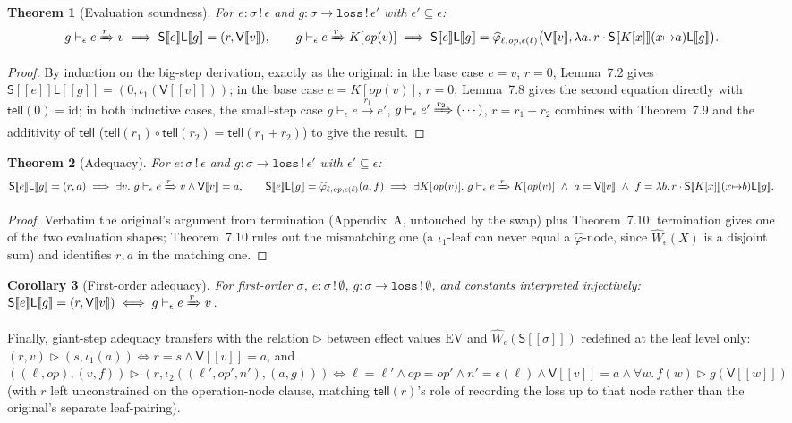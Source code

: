 \documentclass[11pt]{article}
\theoremstyle{plain}
\newtheorem{theorem}{Theorem}
\newtheorem{corollary}[theorem]{Corollary}
\newcommand{\Ssem}[1]{\mathsf{S}[\![#1]\!]}
\newcommand{\Lsem}[1]{\mathsf{L}[\![#1]\!]}
\newcommand{\Vsem}[1]{\mathsf{V}[\![#1]\!]}
\newcommand{\eps}{\epsilon}
\newcommand{\op}{\mathit{op}}
\newcommand{\tell}{\mathsf{tell}}
\begin{document}
\begin{theorem}[Evaluation soundness]
For $e:\sigma\,!\,\eps$ and $g:\sigma\to\mathtt{loss}\,!\,\eps'$ with $\eps'\subseteq\eps$:
\[
  g\vdash_\eps e\xRightarrow{r}v \implies \Ssem e\Lsem g = (r,\Vsem v), \qquad
  g\vdash_\eps e\xRightarrow{r}K[\op(v)] \implies \Ssem e\Lsem g = \widehat\varphi_{\ell,\op,\eps(\ell)}\big(\Vsem v,\lambda a.\,r\cdot\Ssem{K[x]}(x{\mapsto}a)\Lsem g\big).
\]
\end{theorem}
\begin{proof}
By induction on the big-step derivation, exactly as the original: in the base case $e=v$, $r=0$,
Lemma~7.2 gives $\Ssem e\Lsem g = (0,\iota_1(\Vsem v))$; in the base case $e=K[\op(v)]$, $r=0$,
Lemma~7.8 gives the second equation directly with $\tell(0)=\mathrm{id}$; in both inductive
cases, the small-step case $g\vdash_\eps e\xrightarrow{r_1}e'$, $g\vdash_\eps
e'\xRightarrow{r_2}(\cdots)$, $r=r_1+r_2$ combines with Theorem~7.9 and the additivity of
$\tell$ ($\tell(r_1)\circ\tell(r_2) = \tell(r_1+r_2)$) to give the result.
\end{proof}

\begin{theorem}[Adequacy]
For $e:\sigma\,!\,\eps$ and $g:\sigma\to\mathtt{loss}\,!\,\eps'$ with $\eps'\subseteq\eps$:
\[
  \Ssem e\Lsem g = (r,a) \implies \exists v.\ g\vdash_\eps e\xRightarrow{r}v \wedge \Vsem v = a, \qquad
  \Ssem e\Lsem g = \widehat\varphi_{\ell,\op,\eps(\ell)}(a,f) \implies \exists K[\op(v)].\ g\vdash_\eps e\xRightarrow{r}K[\op(v)]\ \wedge\ a=\Vsem v\ \wedge\ f=\lambda b.\,r\cdot\Ssem{K[x]}(x{\mapsto}b)\Lsem g.
\]
\end{theorem}
\begin{proof}
Verbatim the original's argument from termination (Appendix~A, untouched by the swap) plus
Theorem~7.10: termination gives one of the two evaluation shapes; Theorem~7.10 rules out the
mismatching one (a $\iota_1$-leaf can never equal a $\widehat\varphi$-node, since $\widehat
W_\eps(X)$ is a disjoint sum) and identifies $r,a$ in the matching one.
\end{proof}

\begin{corollary}[First-order adequacy]
For first-order $\sigma$, $e:\sigma\,!\,\emptyset$, $g:\sigma\to\mathtt{loss}\,!\,\emptyset$, and
constants interpreted injectively: $\Ssem e\Lsem g = (r,\Vsem v) \iff g\vdash_\eps e\xRightarrow{r}v$.
\end{corollary}

Finally, giant-step adequacy transfers with the relation $\rhd$ between effect values $\mathrm{EV}$
and $\widehat W_\eps(\Ssem\sigma)$ redefined at the leaf level only: $(r,v)\rhd(s,\iota_1(a))
\iff r=s\wedge\Vsem v=a$, and $((\ell,\op),(v,f))\rhd(r,\iota_2((\ell',\op',n'),(a,g))) \iff
\ell=\ell'\wedge\op=\op'\wedge n'=\eps(\ell)\wedge\Vsem v=a\wedge\forall w.\,f(w)\rhd g(\Vsem w)$
(with $r$ left unconstrained on the operation-node clause, matching $\tell(r)$'s role of
recording the loss up to that node rather than the original's separate leaf-pairing).
\end{document}
